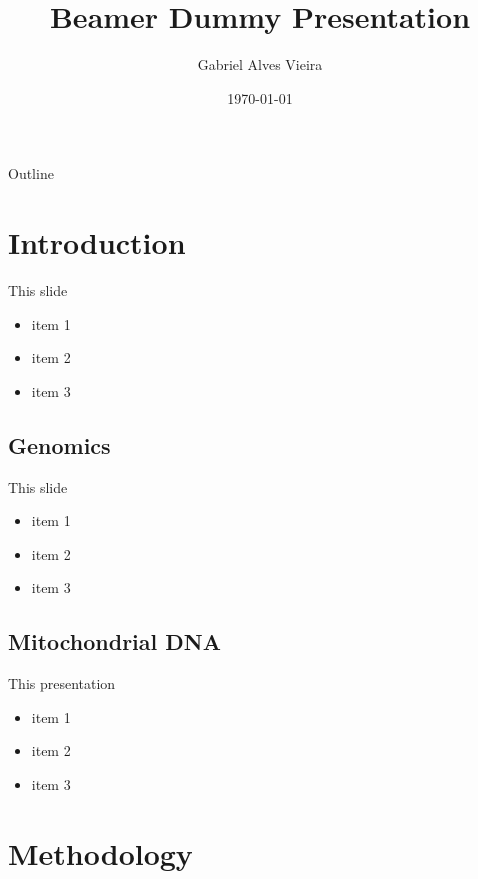 \documentclass{beamer}
\title{Beamer Dummy Presentation}
\author{Gabriel Alves Vieira}
\institute[IBqM]{Instituto de Bioquímica Médica Leopoldo de Méis}
\date{\today}
\begin{document}
	
\maketitle

\begin{frame}{Outline}
	\tableofcontents
\end{frame}


\section{Introduction}

\begin{frame}{This slide}
	\begin{itemize}
		\item item 1
		\item item 2
		\item item 3
	\end{itemize}
\end{frame}

\subsection{Genomics}

\begin{frame}{This slide}
	\begin{itemize}
		\item item 1
		\item item 2
		\item item 3
	\end{itemize}
\end{frame}

\subsection[mtDNA]{Mitochondrial DNA}

\begin{frame}{This presentation}
	\begin{itemize}
		\item item 1
		\item item 2
		\item item 3
	\end{itemize}
\end{frame}

\section{Methodology}
\end{document}
